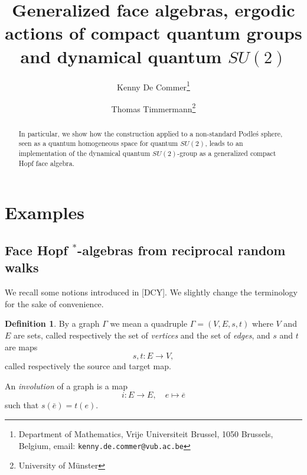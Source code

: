\documentclass[12pt]{article}
\date{}
\theoremstyle{change}
\theoremstyle{definition}
\newtheorem{Def}[Theorem]{Definition}
\numberwithin{equation}{section}
\begin{document}
\title{{\scriptsize Generalized face algebras,} ergodic actions of compact quantum groups {\scriptsize and dynamical quantum $SU(2)$}}

\author{Kenny De Commer\thanks{Department of Mathematics, Vrije Universiteit Brussel, 1050 Brussels, Belgium, email: {\tt kenny.de.commer@vub.ac.be}}
\and Thomas Timmermann\thanks{University of M\"{u}nster}}

\maketitle


\begin{abstract}
 In particular, we show how the construction applied to a non-standard Podle\'{s} sphere, seen as a quantum homogeneous space for quantum $SU(2)$, leads to an implementation of the dynamical quantum $SU(2)$-group as a generalized compact Hopf face algebra.
\end{abstract}

\section*{Examples}

\subsection{Face Hopf $^*$-algebras from reciprocal random walks} 

We recall some notions introduced in [DCY]. We slightly change the terminology for the sake of convenience.

\begin{Def} By a graph $\Gamma$ we mean a quadruple $\Gamma=(V,E,s,t)$ where $V$ and $E$ are sets, called respectively the set of \emph{vertices} and the set of \emph{edges}, and $s$ and $t$ are maps \[s,t:E\rightarrow V,\] called respectively the source and target map.

An \emph{involution} of a graph is a map \[i:E \rightarrow E,\quad e\mapsto \overline{e}\] such that $s(\bar{e}) = t(e)$. 
\end{Def}
\end{document}

